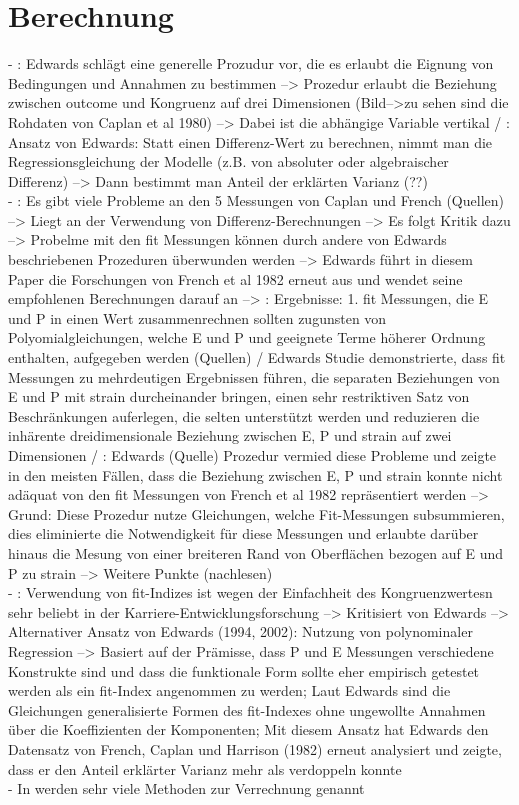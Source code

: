 \section{Berechnung}
\label{ch:personEnvironmentFit:berechnung}
- \cite[S. 15f.]{caplan:1993}: Edwards schlägt eine generelle Prozudur vor, die es erlaubt die Eignung von Bedingungen und Annahmen zu bestimmen --> Prozedur erlaubt die Beziehung zwischen outcome und Kongruenz auf drei Dimensionen (Bild-->zu sehen sind die Rohdaten von Caplan et al 1980) --> Dabei ist die abhängige Variable vertikal / \cite[S. 16]{caplan:1993}: Ansatz von Edwards: Statt einen Differenz-Wert zu berechnen, nimmt man die Regressionsgleichung der Modelle (z.B. von absoluter oder algebraischer Differenz) --> Dann bestimmt man Anteil der erklärten Varianz (??)\\
- \cite[S. 2]{edwards:1993}: Es gibt viele Probleme an den 5 Messungen von Caplan und French (Quellen) --> Liegt an der Verwendung von Differenz-Berechnungen --> Es folgt Kritik dazu --> Probelme mit den fit Messungen können durch andere von Edwards beschriebenen Prozeduren überwunden werden --> Edwards führt in diesem Paper die Forschungen von French et al 1982 erneut aus und wendet seine empfohlenen Berechnungen darauf an --> \cite[S. 19]{edwards:1993}: Ergebnisse: 1. fit Messungen, die E und P in einen Wert zusammenrechnen sollten zugunsten von Polyomialgleichungen, welche E und P und geeignete Terme höherer Ordnung enthalten, aufgegeben werden (Quellen) / Edwards Studie demonstrierte, dass fit Messungen zu mehrdeutigen Ergebnissen führen, die separaten Beziehungen von E und P mit strain durcheinander bringen, einen sehr restriktiven Satz von Beschränkungen auferlegen, die selten unterstützt werden und reduzieren die inhärente dreidimensionale Beziehung zwischen E, P und strain auf zwei Dimensionen / \cite[S. 20]{edwards:1993}: Edwards (Quelle) Prozedur vermied diese Probleme und zeigte in den meisten Fällen, dass die Beziehung zwischen E, P und strain konnte nicht adäquat von den fit Messungen von French et al 1982 repräsentiert werden --> Grund: Diese Prozedur nutze Gleichungen, welche Fit-Messungen subsummieren, dies eliminierte die Notwendigkeit für diese Messungen und erlaubte darüber hinaus die Mesung von einer breiteren Rand von Oberflächen bezogen auf E und P zu strain --> Weitere Punkte (nachlesen)\\
- \cite[S. 7]{su:2015}: Verwendung von fit-Indizes ist wegen der Einfachheit des Kongruenzwertesn sehr beliebt in der Karriere-Entwicklungsforschung --> Kritisiert von Edwards --> Alternativer Ansatz von Edwards (1994, 2002): Nutzung von polynominaler Regression --> Basiert auf der Prämisse, dass P und E Messungen verschiedene Konstrukte sind und dass die funktionale Form sollte eher empirisch getestet werden als ein fit-Index angenommen zu werden; Laut Edwards sind die Gleichungen generalisierte Formen des fit-Indexes ohne ungewollte Annahmen über die Koeffizienten der Komponenten; Mit diesem Ansatz hat Edwards den Datensatz von French, Caplan und Harrison (1982) erneut analysiert und zeigte, dass er den Anteil erklärter Varianz mehr als verdoppeln konnte \\
- In \textcite{edwards:1991} werden sehr viele Methoden zur Verrechnung genannt \\

